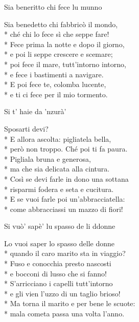 \documentclass[11pt]{book}
\begin{document}
\begin{poem}{Sia beneritto chi fece lu munno}{}
\settowidth{\versewidth}{Poi fece il mare, tutt’intorno intorno}
\begin{altverse}
Sia benedetto chi fabbricò il mondo,\\*
ché chi lo fece sì che seppe fare!\\*
Fece prima la notte e dopo il giorno,\\*
e poi li seppe crescere e scemare;\\*
poi fece il mare, tutt’intorno intorno,\\*
e fece i bastimenti a navigare.\\*
E poi fece te, colomba lucente,\\*
e ti ci fece per il mio tormento.
\end{altverse}
\end{poem}

\begin{poem}{Si t’ haie da ’nzurà’}{}
\settowidth{\versewidth}{Così se devi farle in dono una sottana}
\begin{altverse}
Sposarti devi?\\*
E allora ascolta: pigliatela bella,\\*
però non troppo. Ché poi ti fa paura.\\*
Pigliala bruna e generosa,\\*
ma che sia delicata alla cintura.\\*
Così se devi farle in dono una sottana\\*
risparmi fodera e seta e cucitura.\\*
E se vuoi farle poi un’abbracciatella:\\*
come abbracciassi un mazzo di fiori!
\end{altverse}
\end{poem}

\begin{poem}{Si vuò’ sapè’ lu spasso de li ddonne}{}
\settowidth{\versewidth}{Ma torna il marito e per bene le scuote}
\begin{altverse}
Lo vuoi saper lo spasso delle donne\\*
quando il caro marito sta in viaggio?\\*
Fuso e conocchia presto nascosti\\*
e bocconi di lusso che si fanno!\\*
S’arricciano i capelli tutt’intorno\\*
e gli vien l’uzzo di un taglio brioso!\\*
Ma torna il marito e per bene le scuote:\\*
mala cometa passa una volta l'anno.
\end{altverse}
\end{poem}
\end{document}
